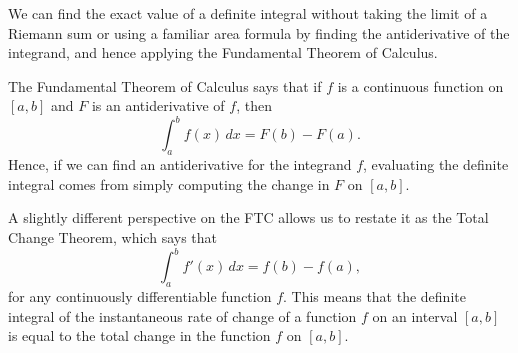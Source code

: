 \begin{summary}
\item We can find the exact value of a definite integral without taking the limit of a Riemann sum or using a familiar area formula by finding the antiderivative of the integrand, and hence applying the Fundamental Theorem of Calculus.
\item The Fundamental Theorem of Calculus says that if $f$ is a continuous function on $[a,b]$ and $F$ is an antiderivative of $f$, then
\[ \int_a^b f(x) \, dx = F(b) - F(a). \]
Hence, if we can find an antiderivative for the integrand $f$, evaluating the definite integral comes from simply computing the change in $F$ on $[a,b]$. 
\item A slightly different perspective on the FTC allows us to restate it as the Total Change Theorem, which says that
\[ \int_a^b f'(x) \, dx = f(b) - f(a), \]
for any continuously differentiable function $f$.   This means that the definite integral of the instantaneous rate of change of a function $f$ on an interval $[a,b]$ is equal to the total change in the function $f$ on $[a,b]$.
\end{summary}

\clearpage

 

\cleardoublepage